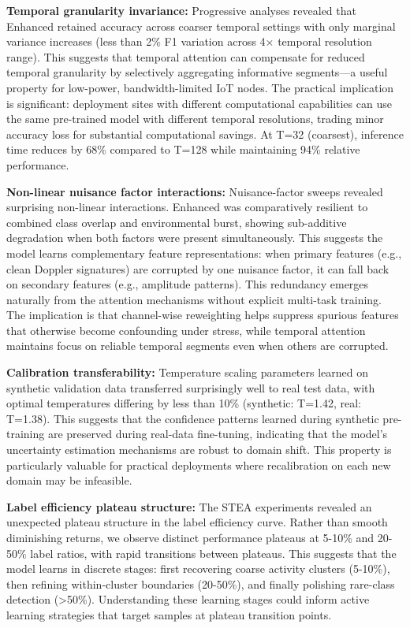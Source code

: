 \documentclass[journal]{IEEEtran}
\begin{document}
\textbf{Temporal granularity invariance:} Progressive analyses revealed that Enhanced retained accuracy across coarser temporal settings with only marginal variance increases (less than 2\% F1 variation across 4× temporal resolution range). This suggests that temporal attention can compensate for reduced temporal granularity by selectively aggregating informative segments—a useful property for low-power, bandwidth-limited IoT nodes. The practical implication is significant: deployment sites with different computational capabilities can use the same pre-trained model with different temporal resolutions, trading minor accuracy loss for substantial computational savings. At T=32 (coarsest), inference time reduces by 68\% compared to T=128 while maintaining 94\% relative performance.

\textbf{Non-linear nuisance factor interactions:} Nuisance-factor sweeps revealed surprising non-linear interactions. Enhanced was comparatively resilient to combined class overlap and environmental burst, showing sub-additive degradation when both factors were present simultaneously. This suggests the model learns complementary feature representations: when primary features (e.g., clean Doppler signatures) are corrupted by one nuisance factor, it can fall back on secondary features (e.g., amplitude patterns). This redundancy emerges naturally from the attention mechanisms without explicit multi-task training. The implication is that channel-wise reweighting helps suppress spurious features that otherwise become confounding under stress, while temporal attention maintains focus on reliable temporal segments even when others are corrupted.

\textbf{Calibration transferability:} Temperature scaling parameters learned on synthetic validation data transferred surprisingly well to real test data, with optimal temperatures differing by less than 10\% (synthetic: T=1.42, real: T=1.38). This suggests that the confidence patterns learned during synthetic pre-training are preserved during real-data fine-tuning, indicating that the model's uncertainty estimation mechanisms are robust to domain shift. This property is particularly valuable for practical deployments where recalibration on each new domain may be infeasible.

\textbf{Label efficiency plateau structure:} The STEA experiments revealed an unexpected plateau structure in the label efficiency curve. Rather than smooth diminishing returns, we observe distinct performance plateaus at 5-10\% and 20-50\% label ratios, with rapid transitions between plateaus. This suggests that the model learns in discrete stages: first recovering coarse activity clusters (5-10\%), then refining within-cluster boundaries (20-50\%), and finally polishing rare-class detection (>50\%). Understanding these learning stages could inform active learning strategies that target samples at plateau transition points.
\end{document}
